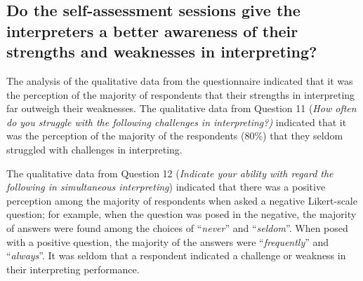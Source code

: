 \documentclass[output=paper]{langsci/langscibook}
\begin{document}
\begin{table}
\caption{\label{tab:deysel:5}Comparison of ratings for experimental and control group}
\end{table}

\subsection{Do the self-assessment sessions give the interpreters a better awareness of their strengths and weaknesses in interpreting?}

The analysis of the qualitative data from the questionnaire indicated that it was the perception of the majority of respondents that their strengths in interpreting far outweigh their weaknesses. The qualitative data from Question 11 (\textit{How often do you struggle with the following challenges in interpreting?)} indicated that it was the perception of the majority of the respondents (80\%) that they seldom struggled with challenges in interpreting. 

The qualitative data from Question 12 (\textit{Indicate your ability with regard the following in simultaneous interpreting}) indicated that there was a positive perception among the majority of respondents when asked a negative Likert-scale question; for example, when the question was posed in the negative, the majority of answers were found among the choices of “\textit{never}” and “\textit{seldom}”. When posed with a positive question, the majority of the answers were “\textit{frequently}” and “\textit{always}”. It was seldom that a respondent indicated a challenge or weakness in their interpreting performance. 
\end{document}
